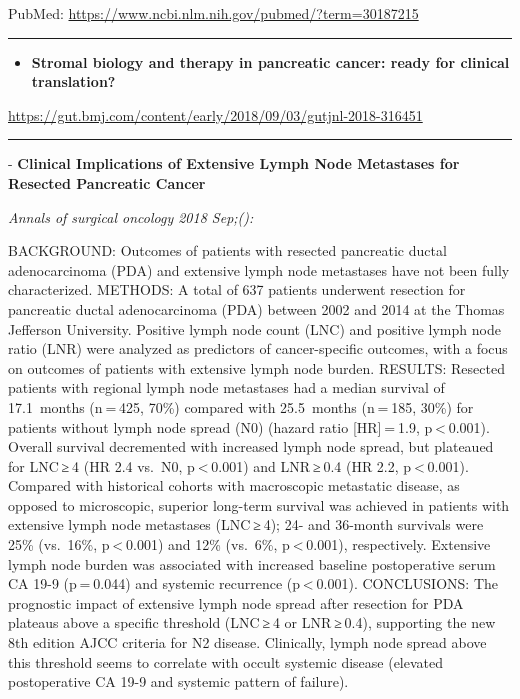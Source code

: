\documentclass[]{article}
\providecommand{\tightlist}{%
  \setlength{\itemsep}{0pt}\setlength{\parskip}{0pt}}
\begin{document}
PubMed: \url{https://www.ncbi.nlm.nih.gov/pubmed/?term=30187215}

{}

{}

\begin{center}\rule{0.5\linewidth}{\linethickness}\end{center}

\begin{itemize}
\tightlist
\item
  \textbf{Stromal biology and therapy in pancreatic cancer: ready for
  clinical translation?}
\end{itemize}

\url{https://gut.bmj.com/content/early/2018/09/03/gutjnl-2018-316451}

\begin{center}\rule{0.5\linewidth}{\linethickness}\end{center}

 - \textbf{Clinical Implications of Extensive Lymph Node Metastases for
Resected Pancreatic Cancer}

\emph{Annals of surgical oncology 2018 Sep;():}

BACKGROUND: Outcomes of patients with resected pancreatic ductal
adenocarcinoma (PDA) and extensive lymph node metastases have not been
fully characterized. METHODS: A total of 637 patients underwent
resection for pancreatic ductal adenocarcinoma (PDA) between 2002 and
2014 at the Thomas Jefferson University. Positive lymph node count (LNC)
and positive lymph node ratio (LNR) were analyzed as predictors of
cancer-specific outcomes, with a focus on outcomes of patients with
extensive lymph node burden. RESULTS: Resected patients with regional
lymph node metastases had a median survival of 17.1~months (n = 425,
70\%) compared with 25.5~months (n = 185, 30\%) for patients without
lymph node spread (N0) (hazard ratio {[}HR{]} = 1.9,
p \textless{} 0.001). Overall survival decremented with increased lymph
node spread, but plateaued for LNC ≥ 4 (HR 2.4 vs.~N0,
p \textless{} 0.001) and LNR ≥ 0.4 (HR 2.2, p \textless{} 0.001).
Compared with historical cohorts with macroscopic metastatic disease, as
opposed to microscopic, superior long-term survival was achieved in
patients with extensive lymph node metastases (LNC ≥ 4); 24- and
36-month survivals were 25\% (vs.~16\%, p \textless{} 0.001) and 12\%
(vs.~6\%, p \textless{} 0.001), respectively. Extensive lymph node
burden was associated with increased baseline postoperative serum CA
19-9 (p = 0.044) and systemic recurrence (p \textless{} 0.001).
CONCLUSIONS: The prognostic impact of extensive lymph node spread after
resection for PDA plateaus above a specific threshold (LNC ≥ 4 or
LNR ≥ 0.4), supporting the new 8th edition AJCC criteria for N2 disease.
Clinically, lymph node spread above this threshold seems to correlate
with occult systemic disease (elevated postoperative CA 19-9 and
systemic pattern of failure).
\end{document}
